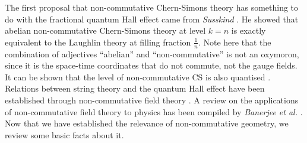     \indent The first proposal that non-commutative Chern-Simons theory has something to do with the fractional quantum Hall effect came from \textit{Susskind} \cite{Susskind:2001fb}. He showed that abelian non-commutative Chern-Simons theory at level $k=n$ is exactly equivalent to the Laughlin theory at filling fraction $\frac{1}{n}$. Note here that the combination of adjectives ``abelian'' and ``non-commutative'' is not an oxymoron, since it is the space-time coordinates that do not commute, not the gauge fields. It can be shown that the level of non-commutative CS is also quantised \cite{Nair:2001rt, Bak:2001ze}. Relations between string theory and the quantum Hall effect have been established through non-commutative field theory \cite{Brodie:2000yz, Bena:2000cs, Gubser:2000dz}.  A review on the applications of non-commutative field theory to physics has been compiled by \textit{Banerjee et al.} \cite{Banerjee:2009gr}. 
    Now that we have established the relevance of non-commutative geometry, we review some basic facts about it.
